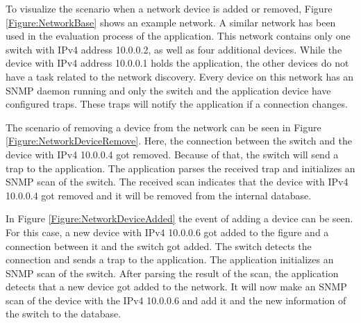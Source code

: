 To visualize the scenario when a network device is added or removed, Figure \ref{Figure:NetworkBase} shows an example network. A similar network has been used in the evaluation process of the application. This network contains only one switch with IPv4 address 10.0.0.2, as well as four additional devices. While the device with IPv4 address 10.0.0.1 holds the application, the other devices do not have a task related to the network discovery. Every device on this network has an SNMP daemon running and only the switch and the application device have configured traps. These traps will notify the application if a connection changes.

The scenario of removing a device from the network can be seen in Figure \ref{Figure:NetworkDeviceRemove}. Here, the connection between the switch and the device with IPv4 10.0.0.4 got removed. Because of that, the switch will send a trap to the application. The application parses the received trap and initializes an SNMP scan of the switch. The received scan indicates that the device with IPv4 10.0.0.4 got removed and it will be removed from the internal database.

In Figure \ref{Figure:NetworkDeviceAdded} the event of adding a device can be seen. For this case, a new device with IPv4 10.0.0.6 got added to the figure and a connection between it and the switch got added. The switch detects the connection and sends a trap to the application. The application initializes an SNMP scan of the switch. After parsing the result of the scan, the application detects that a new device got added to the network. It will now make an SNMP scan of the device with the IPv4 10.0.0.6 and add it and the new information of the switch to the database.







\newpage


